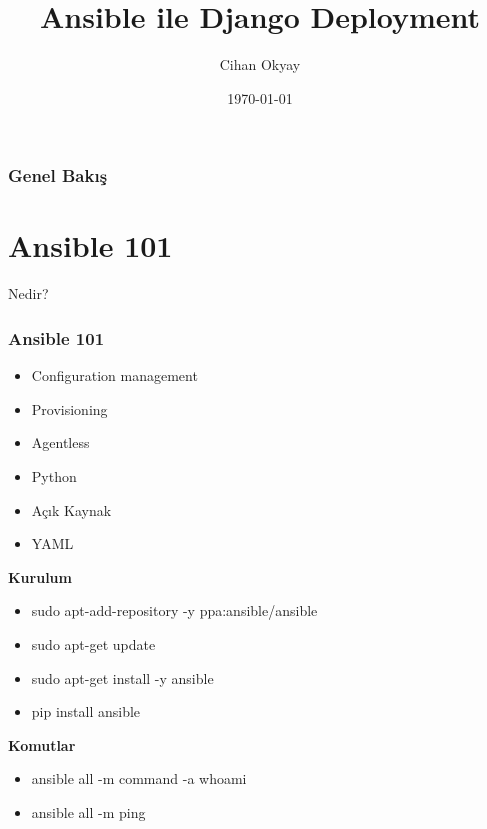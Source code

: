 \documentclass{beamer}
\title[Ansible]{Ansible ile Django Deployment} %
\author{Cihan Okyay} %
\institute[pyistanbul] %
{
Python Istanbul \\ %
\medskip
\textit{@cihann, okyaycihan@gmail.com} %
}
\date{\today} %
\begin{document}
\begin{frame}
\titlepage %
\end{frame}

\begin{frame}
\frametitle{Genel Bakış} %
\tableofcontents %
\end{frame}


\section{Ansible 101} %
\begin{frame}
{Nedir?}
\frametitle{Ansible 101}
\begin{itemize}
\item Configuration management
\item Provisioning
\item Agentless
\item Python
\item Açık Kaynak
\item YAML
\end{itemize}

\end{frame}

\begin{frame}
\textbf{Kurulum}
\begin{itemize}
\item sudo apt-add-repository -y ppa:ansible/ansible
\item sudo apt-get update
\item sudo apt-get install -y ansible
\vspace{.25in}
\item pip install ansible
\end{itemize}

\vspace{0.25in}

\textbf{Komutlar}
\begin{itemize}
\item ansible all -m command -a whoami
\item ansible all -m ping
\end{itemize}
\end{frame}
\end{document}
